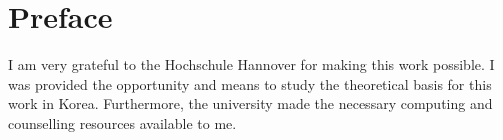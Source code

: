 \chapter*{Preface}

I am very grateful to the Hochschule Hannover for making this work possible. I was provided the opportunity and means to study the theoretical basis for this work in Korea. Furthermore, the university made the necessary computing and counselling resources available to me.
